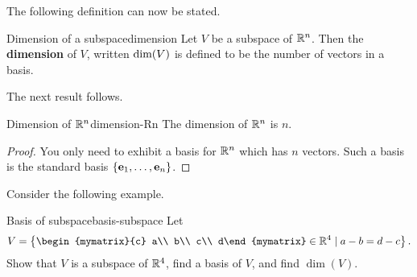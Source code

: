 The following definition can now be stated.

\begin{definition}{Dimension of a subspace}{dimension}
  Let $V$ be a subspace of\/ $\mathbb{R}^{n}$. Then the \textbf{dimension }of
  $V$, written $\mbox{\rm dim}(V)$ is defined to be the number of vectors
  in a basis.
\end{definition}

The next result follows.

\begin{corollary}{Dimension of\/ $\mathbb{R}^n$}{dimension-Rn}
  The dimension of\/ $\mathbb{R}^{n}$ is $n$.
\end{corollary}

\begin{proof}
  You only need to exhibit a basis for $\mathbb{R}^{n}$ which has $n$
  vectors. Such a basis is the standard basis
  $\left\{\mbox{\bf e}_{1},\ldots , \mbox{\bf e}_{n}\right\}$.
\end{proof}

Consider the following example.

\begin{example}{Basis of subspace}{basis-subspace}
  Let 
  \begin{equation*}
    V=\set{
      \begin{mymatrix}{c} a\\ b\\ c\\ d\end{mymatrix}\in\R^4 \mid
      a-b=d-c
    }.
  \end{equation*}
  Show that $V$ is a subspace of\/ $\mathbb{R}^4$, find a basis of $V$, and find
  $\dim(V)$.
\end{example}

